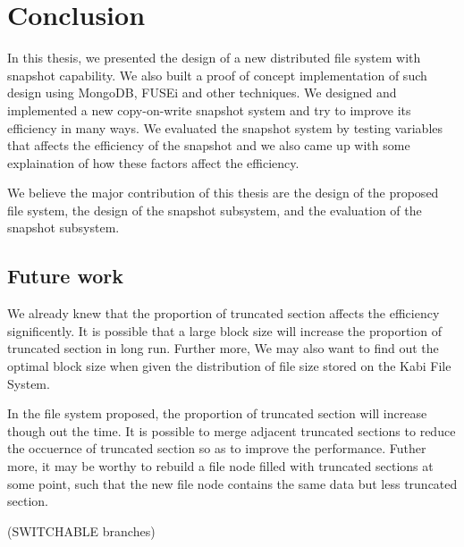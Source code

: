 \chapter{Conclusion}
\label{chap:conclusion}

    In this thesis, we presented the design of a new distributed file system with snapshot capability. We also built a proof of concept implementation of such design using MongoDB, FUSEi and other techniques. We designed and implemented a new copy-on-write snapshot system and try to improve its efficiency in many ways. We evaluated the snapshot system by testing variables that affects the efficiency of the snapshot and we also came up with some explaination of how these factors affect the efficiency.

    We believe the major contribution of this thesis are the design of the proposed file system, the design of the snapshot subsystem, and the evaluation of the snapshot subsystem.

\section{Future work}

     We already knew that the proportion of truncated section affects the efficiency significently. It is possible that a large block size will increase the proportion of truncated section in long run. Further more, We may also want to find out the optimal block size when given the distribution of file size stored on the Kabi File System.

     In the file system proposed, the proportion of truncated section will increase though out the time. It is possible to merge adjacent truncated sections to reduce the occuernce of truncated section so as to improve the performance. Futher more, it may be worthy to rebuild a file node filled with truncated sections at some point, such that the new file node contains the same data but less truncated section.

     (SWITCHABLE branches)
